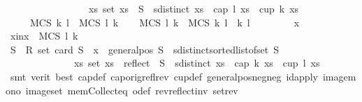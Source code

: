 \begin{isabellebody}
\ \ \ \ \ \ \ \ \ \ \ \ \ \ \ \ {\isasymlongrightarrow}\ {\isacharparenleft}{\kern0pt}{\isasymexists}xs{\isachardot}{\kern0pt}\ set\ xs\ {\isasymsubseteq}\ S\ {\isasymand}\ sdistinct\ xs\ {\isasymand}\ {\isacharparenleft}{\kern0pt}cap\ l\ xs\ {\isasymor}\ cup\ k\ xs{\isacharparenright}{\kern0pt}{\isacharparenright}{\kern0pt}{\isacharparenright}{\kern0pt}{\isacharbraceright}{\kern0pt}{\isachardoublequoteclose}\isanewline
\ \ \ \ {\isacharparenleft}{\kern0pt}\ {\isachardoublequoteopen}{\isacharquery}{\kern0pt}MCS\ k\ l\ {\isacharequal}{\kern0pt}\ {\isacharquery}{\kern0pt}MCS\ l\ k{\isachardoublequoteclose}{\isacharparenright}{\kern0pt}\isanewline
%
\isadelimproof
%
\endisadelimproof
%
\isatagproof
{}\isamarkupfalse%
{\isacharminus}{\kern0pt}\isanewline
\isanewline
\ \ \isamarkupfalse%
\ {\isachardoublequoteopen}{\isacharquery}{\kern0pt}MCS\ l\ k\ {\isasymsubseteq}\ {\isacharquery}{\kern0pt}MCS\ k\ l{\isachardoublequoteclose}\ \ k\ l\isanewline
\ \ \isamarkupfalse%
\isanewline
\ \ \ \ \isamarkupfalse%
\ x\isanewline
\ \ \ \ \isamarkupfalse%
\ x{\isacharunderscore}{\kern0pt}in{\isacharcolon}{\kern0pt}{\isachardoublequoteopen}x\ {\isasymin}\ {\isacharquery}{\kern0pt}MCS\ l\ k{\isachardoublequoteclose}\isanewline
\isanewline
\ \ \ \ \isamarkupfalse%
\ {\isachardoublequoteopen}{\isasymforall}S\ {\isacharcolon}{\kern0pt}{\isacharcolon}{\kern0pt}\ R{}\ set{\isachardot}{\kern0pt}\ card\ S\ {\isasymge}\ x\ {\isasymand}\ general{\isacharunderscore}{\kern0pt}pos\ S\ {\isasymand}\ sdistinct{\isacharparenleft}{\kern0pt}sorted{\isacharunderscore}{\kern0pt}list{\isacharunderscore}{\kern0pt}of{\isacharunderscore}{\kern0pt}set\ S{\isacharparenright}{\kern0pt}\isanewline
\ \ \ \ \ \ \ \ \ \ \ \ \ {\isasymlongrightarrow}\ {\isacharparenleft}{\kern0pt}{\isasymexists}xs{\isachardot}{\kern0pt}\ set\ xs\ {\isasymsubseteq}\ {\isacharparenleft}{\kern0pt}reflect\ {\isacharbackquote}{\kern0pt}\ S{\isacharparenright}{\kern0pt}\ {\isasymand}\ sdistinct\ xs\ {\isasymand}\ {\isacharparenleft}{\kern0pt}cap\ k\ xs\ {\isasymor}\ cup\ l\ xs{\isacharparenright}{\kern0pt}{\isacharparenright}{\kern0pt}{\isachardoublequoteclose}\isanewline
\ \ \ \ \ \ \isamarkupfalse%
\ {\isacharparenleft}{\kern0pt}smt\ {\isacharparenleft}{\kern0pt}verit{\isacharcomma}{\kern0pt}\ best{\isacharparenright}{\kern0pt}\ cap{\isacharunderscore}{\kern0pt}def\ cap{\isacharunderscore}{\kern0pt}orig{\isacharunderscore}{\kern0pt}refl{\isacharunderscore}{\kern0pt}rev\ cup{\isacharunderscore}{\kern0pt}def\ general{\isacharunderscore}{\kern0pt}pos{\isacharunderscore}{\kern0pt}neg{\isacharunderscore}{\kern0pt}neg\ id{\isacharunderscore}{\kern0pt}apply\ image{\isacharunderscore}{\kern0pt}mono\ image{\isacharunderscore}{\kern0pt}set\ mem{\isacharunderscore}{\kern0pt}Collect{\isacharunderscore}{\kern0pt}eq\ o{\isacharunderscore}{\kern0pt}def\ rev{\isacharunderscore}{\kern0pt}reflect{\isacharunderscore}{\kern0pt}inv\ set{\isacharunderscore}{\kern0pt}rev{\isacharparenright}{\kern0pt}\isanewline

\end{isabellebody}
